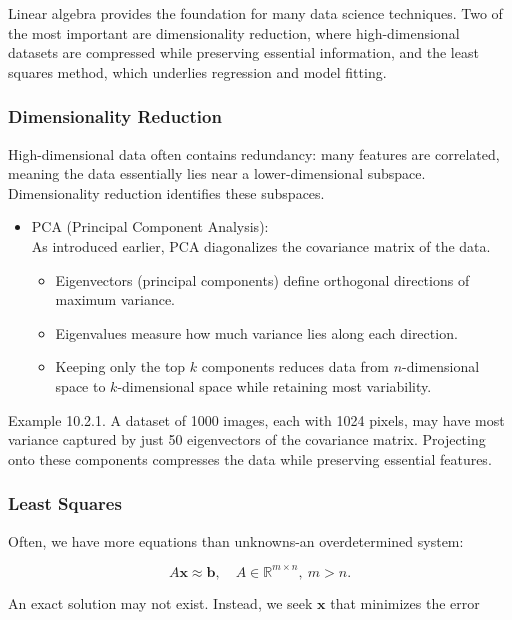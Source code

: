 \documentclass[
  12pt,
  a4paper,
]{article}
\begin{document}
Linear algebra provides the foundation for many data science techniques.
Two of the most important are dimensionality reduction, where
high-dimensional datasets are compressed while preserving essential
information, and the least squares method, which underlies regression
and model fitting.

\subsubsection{Dimensionality Reduction}\label{dimensionality-reduction}

High-dimensional data often contains redundancy: many features are
correlated, meaning the data essentially lies near a lower-dimensional
subspace. Dimensionality reduction identifies these subspaces.

\begin{itemize}
\item
  PCA (Principal Component Analysis):\\
  As introduced earlier, PCA diagonalizes the covariance matrix of the
  data.

  \begin{itemize}
  \item
    Eigenvectors (principal components) define orthogonal directions of
    maximum variance.
  \item
    Eigenvalues measure how much variance lies along each direction.
  \item
    Keeping only the top \(k\) components reduces data from
    \(n\)-dimensional space to \(k\)-dimensional space while retaining
    most variability.
  \end{itemize}
\end{itemize}

Example 10.2.1. A dataset of 1000 images, each with 1024 pixels, may
have most variance captured by just 50 eigenvectors of the covariance
matrix. Projecting onto these components compresses the data while
preserving essential features.

\subsubsection{Least Squares}\label{least-squares}

Often, we have more equations than unknowns-an overdetermined system:

\[A\mathbf{x} \approx \mathbf{b}, \quad A \in \mathbb{R}^{m \times n}, \ m > n.\]

An exact solution may not exist. Instead, we seek \(\mathbf{x}\) that
minimizes the error
\end{document}
